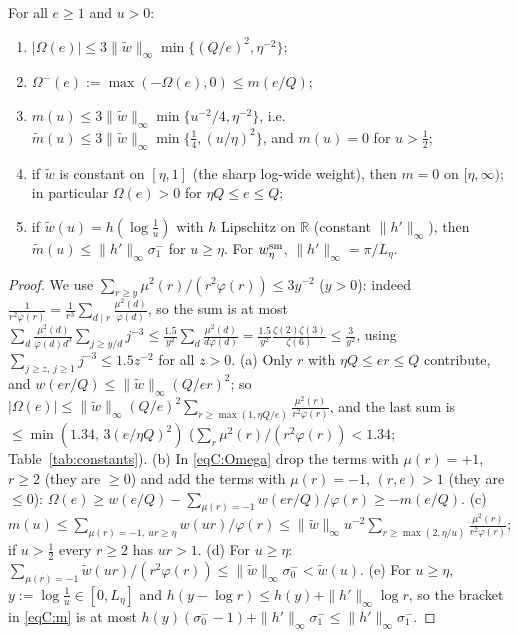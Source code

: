 \begin{lemma}\label{lem:Omega}
For all $e\ge1$ and $u>0$:
\begin{enumerate}
\item[(a)] $|\Omega(e)|\le3\|\widetilde w\|_\infty\min\{(Q/e)^2,\eta^{-2}\}$;
\item[(b)] $\Omega^-(e):=\max(-\Omega(e),0)\le m(e/Q)$;
\item[(c)] $m(u)\le3\|\widetilde w\|_\infty\min\{u^{-2}/4,\eta^{-2}\}$, i.e.\ $\widetilde m(u)\le 3\|\widetilde w\|_\infty\min\{\frac14,(u/\eta)^2\}$, and
 $m(u)=0$ for $u>\frac12$;
\item[(d)] if $\widetilde w$ is constant on $[\eta,1]$ (the sharp log-wide weight), then $m=0$ on $[\eta,\infty)$; in particular
 $\Omega(e)>0$ for $\eta Q\le e\le Q$;
\item[(e)] if $\widetilde w(u)=h(\log\frac1u)$ with $h$ Lipschitz on $\mathbb R$ (constant $\|h'\|_\infty$), then
 $\widetilde m(u)\le\|h'\|_\infty\sigma_1^-$ for $u\ge\eta$. For $w^{\rm sm}_\eta$, $\|h'\|_\infty=\pi/L_\eta$.
\end{enumerate}
\end{lemma}

\begin{proof}
We use $\sum_{r\ge y}\mu^2(r)/(r^2\varphi(r))\le3y^{-2}$ ($y>0$): indeed $\frac1{r^2\varphi(r)}=\frac1{r^3}\sum_{d\mid r}\frac{\mu^2(d)}{\varphi(d)}$, so the sum is
at most $\sum_d\frac{\mu^2(d)}{\varphi(d)d^3}\sum_{j\ge y/d}j^{-3}\le\frac{1.5}{y^2}\sum_d\frac{\mu^2(d)}{d\varphi(d)}=\frac{1.5}{y^2}\frac{\zeta(2)\zeta(3)}{\zeta(6)}\le\frac3{y^2}$,
using $\sum_{j\ge z,\,j\ge1}j^{-3}\le1.5z^{-2}$ for all $z>0$.
(a) Only $r$ with $\eta Q\le er\le Q$ contribute, and $w(er/Q)\le\|\widetilde w\|_\infty(Q/er)^2$; so
$|\Omega(e)|\le\|\widetilde w\|_\infty(Q/e)^2\sum_{r\ge\max(1,\eta Q/e)}\frac{\mu^2(r)}{r^2\varphi(r)}$, and the last sum is $\le\min(1.34,\,3(e/\eta Q)^2)$ ($\sum_r\mu^2(r)/(r^2\varphi(r))<1.34$; Table~\ref{tab:constants}).
(b) In \eqref{eqC:Omega} drop the terms with $\mu(r)=+1$, $r\ge2$ (they are $\ge0$) and add the terms with $\mu(r)=-1$, $(r,e)>1$
(they are $\le0$): $\Omega(e)\ge w(e/Q)-\sum_{\mu(r)=-1}w(er/Q)/\varphi(r)\ge-m(e/Q)$.
(c) $m(u)\le\sum_{\mu(r)=-1,\ ur\ge\eta}w(ur)/\varphi(r)\le\|\widetilde w\|_\infty u^{-2}\sum_{r\ge\max(2,\eta/u)}\frac{\mu^2(r)}{r^2\varphi(r)}$; if $u>\frac12$ every
$r\ge2$ has $ur>1$.
(d) For $u\ge\eta$: $\sum_{\mu(r)=-1}\widetilde w(ur)/(r^2\varphi(r))\le\|\widetilde w\|_\infty\sigma_0^-<\widetilde w(u)$.
(e) For $u\ge\eta$, $y:=\log\frac1u\in[0,L_\eta]$ and $h(y-\log r)\le h(y)+\|h'\|_\infty\log r$, so the bracket in \eqref{eqC:m} is at most
$h(y)(\sigma_0^--1)+\|h'\|_\infty\sigma_1^-\le\|h'\|_\infty\sigma_1^-$.
\end{proof}


